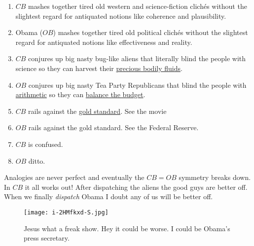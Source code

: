\begin{enumerate}
\tightlist
\item
  $CB$ mashes together tired old western and science-fiction clichés
  without the slightest regard for antiquated notions like coherence and
  plausibility.
\item
  Obama ($OB$) mashes together tired old political clichés without the
  slightest regard for antiquated notions like effectiveness and
  reality.
\item
  $CB$ conjures up big nasty bug-like aliens that literally blind the
  people with science so they can harvest their
  \href{http://www.youtube.com/watch?v=N1KvgtEnABY}{precious bodily
  fluids}.
\item
  $OB$ conjures up big nasty Tea Party Republicans that blind the people
  with \href{http://www.ardue.org.uk/world/finarith.html}{arithmetic} so
  they can
  \href{http://www.thedailylink.org/2005/04/good-god-just-balance-fucking-budget.html}{balance
  the budget}.
\item
  $CB$ rails against the
  \href{http://www.econlib.org/library/Enc/GoldStandard.html}{gold
  standard}. See the movie
\item
  $OB$ rails against the gold standard. See the Federal Reserve.
\item
  $CB$ is confused.
\item
  $OB$ ditto.
\end{enumerate}



Analogies are never perfect and eventually the $CB = OB$ symmetry
breaks down. In $CB$ it all works out! After dispatching the aliens the
good guys are better off. When we finally \emph{dispatch} Obama I doubt
any of us will be better off.

\captionsetup[figure]{labelformat=empty}
\begin{SCfigure}[1][!b]
  \centering
  \texttt{[image: i-2HMfkxd-S.jpg]}
  \caption{Jesus  what a freak show. Hey it could be worse. I could be Obama's press  secretary.}
  \label{fig:1698X2}
\end{SCfigure}

